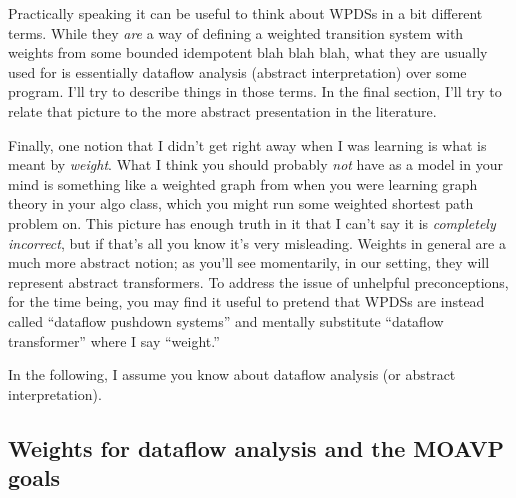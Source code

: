 \documentclass{article}
\begin{document}
Practically speaking it can be useful to think about WPDSs in a bit
different terms. While they \emph{are} a way of defining a weighted
transition system with weights from some bounded idempotent blah blah
blah, what they are usually used for is essentially dataflow analysis
(abstract interpretation) over some program. I'll try to describe
things in those terms. In the final section, I'll try to relate that
picture to the more abstract presentation in the literature.

Finally, one notion that I didn't get right away when I was learning
is what is meant by \emph{weight}. What I think you should probably
\emph{not} have as a model in your mind is something like a weighted
graph from when you were learning graph theory in your algo class,
which you might run some weighted shortest path problem on. This
picture has enough truth in it that I can't say it is \emph{completely
  incorrect}\footnotemark, but if that's all you know it's very
misleading. Weights in general are a much more abstract notion; as
you'll see momentarily, in our setting, they will represent abstract
transformers. To address the issue of unhelpful preconceptions, for
the time being, you may find it useful to pretend that WPDSs are
instead called ``dataflow pushdown systems'' and mentally substitute
``dataflow transformer'' where I say ``weight.''


In the following, I assume you know about dataflow analysis (or
abstract interpretation).

\subsection{Weights for dataflow analysis and the MOAVP goals}
\end{document}
